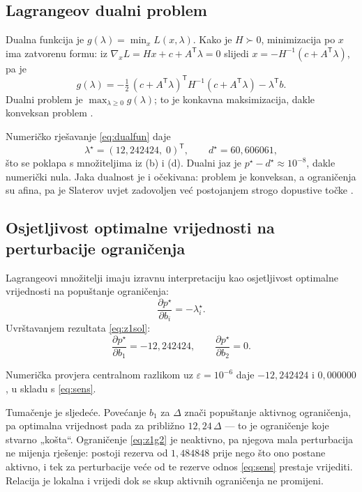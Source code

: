 \subsection{Lagrangeov dualni problem}
\label{sec:zad1:dual}

Dualna funkcija je $g(\lambda) = \min_x L(x,\lambda)$. Kako je $H \succ 0$,
minimizacija po $x$ ima zatvorenu formu: iz $\nabla_x L = Hx + c + A^{\mathsf T}\lambda = 0$
slijedi $x = -H^{-1}(c + A^{\mathsf T}\lambda)$, pa je
\begin{equation}
  g(\lambda) = -\tfrac{1}{2}\,(c + A^{\mathsf T}\lambda)^{\mathsf T} H^{-1} (c + A^{\mathsf T}\lambda) - \lambda^{\mathsf T}b .
  \label{eq:dualfun}
\end{equation}
Dualni problem je $\max_{\lambda \ge 0} g(\lambda)$; to je konkavna maksimizacija,
dakle konveksan problem \cite[str.~24]{jokic_dualnost}.

Numeričko rješavanje \eqref{eq:dualfun} daje
\begin{equation}
  \lambda^\star = (12{,}242424,\; 0)^{\mathsf T}, \qquad d^\star = 60{,}606061 ,
\end{equation}
što se poklapa s množiteljima iz (b) i (d). Dualni jaz je
$p^\star - d^\star \approx 10^{-8}$, dakle numerički nula. Jaka dualnost je i
očekivana: problem je konveksan, a ograničenja su afina, pa je Slaterov uvjet
zadovoljen već postojanjem strogo dopustive točke \cite[str.~28]{jokic_dualnost}.

\subsection{Osjetljivost optimalne vrijednosti na perturbacije ograničenja}
\label{sec:zad1:osjetljivost}

Lagrangeovi množitelji imaju izravnu interpretaciju kao osjetljivost optimalne
vrijednosti na popuštanje ograničenja:
\begin{equation}
  \frac{\partial p^\star}{\partial b_i} = -\lambda_i^\star .
  \label{eq:sens}
\end{equation}
Uvrštavanjem rezultata \eqref{eq:z1sol}:
\begin{equation}
  \frac{\partial p^\star}{\partial b_1} = -12{,}242424, \qquad
  \frac{\partial p^\star}{\partial b_2} = 0 .
\end{equation}

Numerička provjera centralnom razlikom uz $\varepsilon = 10^{-6}$ daje
$-12{,}242424$ i $0{,}000000$, u skladu s \eqref{eq:sens}.

Tumačenje je sljedeće. Povećanje $b_1$ za $\Delta$ znači popuštanje aktivnog
ograničenja, pa optimalna vrijednost pada za približno $12{,}24\,\Delta$ --- to je
ograničenje koje stvarno „košta“. Ograničenje \eqref{eq:z1g2} je neaktivno, pa
njegova mala perturbacija ne mijenja rješenje: postoji rezerva od
$1{,}484848$ prije nego što ono postane aktivno, i tek za perturbacije veće od te
rezerve odnos \eqref{eq:sens} prestaje vrijediti. Relacija je lokalna i vrijedi
dok se skup aktivnih ograničenja ne promijeni.
